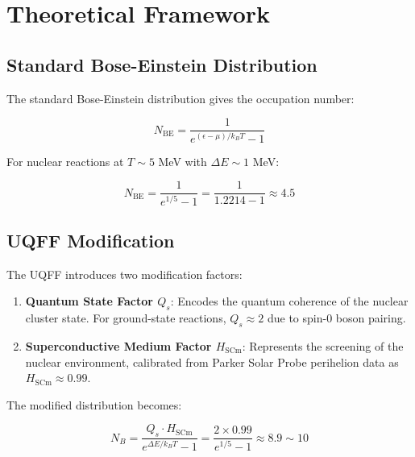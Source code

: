 \documentclass[12pt,preprint]{article}
\begin{document}
\section{Theoretical Framework}

\subsection{Standard Bose-Einstein Distribution}

The standard Bose-Einstein distribution gives the occupation number:

\begin{equation}
N_{\text{BE}} = \frac{1}{e^{(\epsilon - \mu) / k_B T} - 1}
\end{equation}

For nuclear reactions at $T \sim 5$ MeV with $\Delta E \sim 1$ MeV:

\begin{equation}
N_{\text{BE}} = \frac{1}{e^{1/5} - 1} = \frac{1}{1.2214 - 1} 
\approx 4.5
\end{equation}

\subsection{UQFF Modification}

The UQFF introduces two modification factors:

\begin{enumerate}
    \item \textbf{Quantum State Factor $Q_s$}: Encodes the quantum 
    coherence of the nuclear cluster state. For ground-state reactions, 
    $Q_s \approx 2$ due to spin-0 boson pairing.
    
    \item \textbf{Superconductive Medium Factor $H_{\text{SCm}}$}: 
    Represents the screening of the nuclear environment, calibrated 
    from Parker Solar Probe perihelion data as $H_{\text{SCm}} \approx 0.99$.
\end{enumerate}

The modified distribution becomes:

\begin{equation}
N_B = \frac{Q_s \cdot H_{\text{SCm}}}{e^{\Delta E / k_B T} - 1}
= \frac{2 \times 0.99}{e^{1/5} - 1} \approx 8.9 \sim 10
\label{eq:N_B_prediction}
\end{equation}
\end{document}
